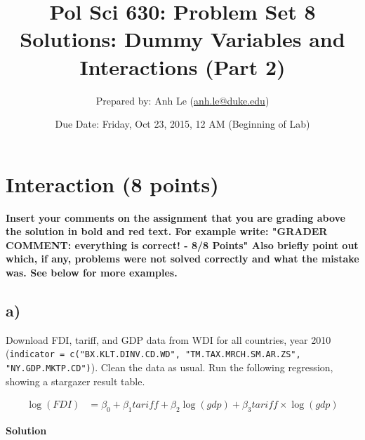 \documentclass{article}\usepackage[]{graphicx}\usepackage[]{color}
\begin{document}
\title{Pol Sci 630:  Problem Set 8 Solutions: Dummy Variables and Interactions (Part 2)}

\author{Prepared by: Anh Le (\href{mailto:anh.le@duke.edu}{anh.le@duke.edu})}

\date{Due Date: Friday, Oct 23, 2015, 12 AM (Beginning of Lab)}

\maketitle

\section{Interaction (8 points)}

\textbf{\color{red} Insert your comments on the assignment that you are grading above the solution in bold and red text. For example write: "GRADER COMMENT: everything is correct! - 8/8 Points" Also briefly point out which, if any, problems were not solved correctly and what the mistake was. See below for more examples.}

\subsection*{a)}

Download FDI, tariff, and GDP data from WDI for all countries, year 2010 (\verb`indicator = c("BX.KLT.DINV.CD.WD", "TM.TAX.MRCH.SM.AR.ZS", "NY.GDP.MKTP.CD")`). Clean the data as usual. Run the following regression, showing a stargazer result table.

\begin{align}
\log(FDI) &= \beta_0 + \beta_1 tariff + \beta_2 \log(gdp) + \beta_3 tariff \times \log(gdp)
\end{align}

\textbf{Solution}
\end{document}
